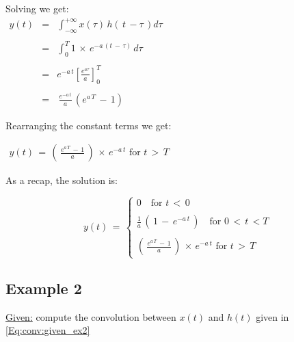 \begin{itemize}
\begin{enumerate}
Solving we get:\\

$\begin{array}{rcl}
y(t) &=& \displaystyle \int_{-\infty}^{+\infty} x(\tau) \, h\left(\,t \, - \tau\, \right) d \tau  \\ \\
    &=& \displaystyle \int_{0}^{T}  1 \, \times \, e^{-a \, (t \, - \, \tau)} \, d \tau \\ \\
    &=& e^{-a \, t}  \left[ \displaystyle\frac{e^{a\tau}}{a} \right]_{0}^{T} \\ \\ 
    &=& \, \displaystyle\frac{e^{-a \, t}}{a} \, (e^{a \, T} \, - \, 1)
\end{array}$

Rearranging the constant terms we get:


$\begin{array}{rcl}

y(t) \, = \, \left(\, \displaystyle\frac{e^{a \, T} \, - \, 1}{a} \,\right) \, \times \, e^{-a \, t} \text{ for } t \, > \, T

\end{array}$    
    \end{enumerate}

    
\end{itemize}

As a recap, the solution is:

\begin{equation}
y(t) \, = \, 
\begin{cases}
       0 \quad \text{for } t \, < \, 0  \\ \\
        \displaystyle\frac{1}{a} \, \left(\, 1 \, - \, e^{-a \, t}   \, \right) \quad \text{for } 0 \, < \, t \, < T \\ \\
        \left(\, \displaystyle\frac{e^{a \, T} \, - \, 1}{a} \,\right) \, \times \, e^{-a \, t} \text{ for } t \, > \, T
\end{cases} 
\end{equation}



\newpage
\subsection{Example 2}

\underline{Given:} compute the convolution between $x(t)$ and $h(t)$ given in \autoref{Eq:conv:given_ex2}

